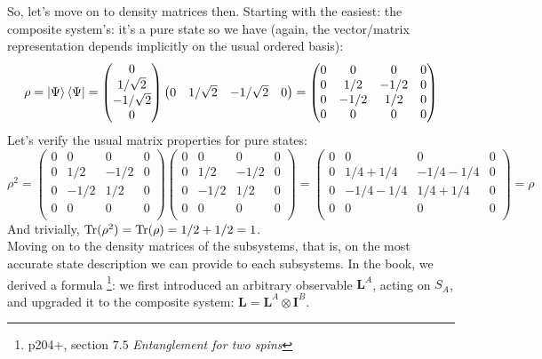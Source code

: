 \documentclass[solutions.tex]{subfiles}
\begin{document}
So, let's move on to density matrices then. Starting with the easiest:
the composite system's: it's a pure state so we have (again,
the vector/matrix representation depends implicitly on the usual
ordered basis):
\[
	\rho = \left| \Psi \right\rangle\left\langle \Psi \right| = \begin{pmatrix}
		0 \\
		1/\sqrt2 \\
		-1/\sqrt2 \\
		0 \\
	\end{pmatrix}\begin{pmatrix}
		0 & 1/\sqrt2 & -1/\sqrt2 & 0 \\
	\end{pmatrix} = \begin{pmatrix}
		0 & 0    & 0    & 0 \\
		0 & 1/2  & -1/2 & 0 \\
		0 & -1/2 & 1/2  & 0 \\
		0 & 0    & 0    & 0 \\
	\end{pmatrix}
\]
Let's verify the usual matrix properties for pure states:
\[
	\rho^2 = \begin{pmatrix}
		0 & 0    & 0    & 0 \\
		0 & 1/2  & -1/2 & 0 \\
		0 & -1/2 & 1/2  & 0 \\
		0 & 0    & 0    & 0 \\
	\end{pmatrix}\begin{pmatrix}
		0 & 0    & 0    & 0 \\
		0 & 1/2  & -1/2 & 0 \\
		0 & -1/2 & 1/2  & 0 \\
		0 & 0    & 0    & 0 \\
	\end{pmatrix} = \begin{pmatrix}
		0 & 0    & 0    & 0 \\
		0 & 1/4+1/4  & -1/4-1/4 & 0 \\
		0 & -1/4-1/4 & 1/4+1/4  & 0 \\
		0 & 0    & 0    & 0 \\
	\end{pmatrix} = \rho
\]
And trivially, $\text{Tr}(\rho^2) = \text{Tr}(\rho) = 1/2 + 1/2 = 1$. \\

Moving on to the density matrices of the subsystems, that is, on
the most accurate state description we can provide to each subsystems.
In the book, we derived a formula%
\footnote{p204+, section $7.5$ \textit{Entanglement for two spins}}:
we first introduced an arbitrary observable $\bm{L}^A$, acting on $S_A$,
and upgraded it to the composite system: $\bm{L} = \bm{L}^A\otimes\bm{I}^B$. \\
\end{document}
